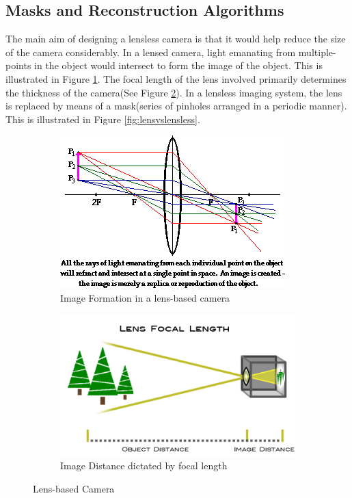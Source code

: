 \subsection{Masks and Reconstruction Algorithms}
The main aim of designing a lensless camera is that it would help reduce the size of the camera considerably. In a lensed camera, light emanating from multiple-points in the object would intersect to form the image of the object. This is illustrated in Figure \ref{fig:lens_image}. The focal length of the lens involved primarily determines the thickness of the camera(See Figure \ref{fig:focal_length}). In a lensless imaging system, the lens is replaced by means of a mask(series of pinholes arranged in a periodic manner). This is illustrated in Figure \ref{fig:lensvslensless}.
\begin{figure}[ht]
\centering
\begin{subfigure}{0.75\textwidth}
  \centering
  \includegraphics[width=\linewidth]{pics/lensed_image_formation}
  \caption{Image Formation in a lens-based camera\cite{lens1}}
  \label{fig:lens_image}
\end{subfigure}
\begin{subfigure}{1\textwidth}
  \centering
  \includegraphics[width=.65\linewidth]{pics/focal_length}
  \caption{Image Distance dictated by focal length \cite{lens2}}
  \label{fig:focal_length}
\end{subfigure}
\caption{Lens-based Camera}
\label{fig:lens_based}
\end{figure}

